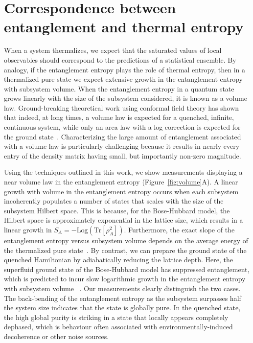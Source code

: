 \section{Correspondence between entanglement and thermal entropy}

When a system thermalizes, we expect that the saturated values of local observables should correspond to the predictions of a statistical ensemble. By analogy, if the entanglement entropy plays the role of thermal entropy, then in a thermalized pure state we expect extensive growth in the entanglement entropy with subsystem volume. When the entanglement entropy in a quantum state grows linearly with the size of the subsystem considered, it is known as a volume law. Ground-breaking theoretical work using conformal field theory has shown that indeed, at long times, a volume law is expected for a quenched, infinite, continuous system, while only an area law with a log correction is expected for the ground state~\cite{CardyGS, CardyOneD, Plenio2010}. Characterizing the large amount of entanglement associated with a volume law is particularly challenging because it results in nearly every entry of the density matrix having small, but importantly non-zero magnitude. 

Using the techniques outlined in this work, we show measurements displaying a near volume law in the entanglement entropy (Figure~\ref{fig:volume}A). A linear growth with volume in the entanglement entropy occurs when each subsystem incoherently populates a number of states that scales with the size of the subsystem Hilbert space. This is because, for the Bose-Hubbard model, the Hilbert space is approximately exponential in the lattice size, which results in a linear growth in $S_A = -\textrm{Log}(\textrm{Tr}[\rho_{A}^2])$. Furthermore, the exact slope of the entanglement entropy versus subsystem volume depends on the average energy of the thermalized pure state~\cite{Grover2015}.  By contrast, we can prepare the ground state of the quenched Hamiltonian by adiabatically reducing the lattice depth. Here, the superfluid ground state of the Bose-Hubbard model has suppressed entanglement, which is predicted to incur slow logarithmic growth in the entanglement entropy with subsystem volume~\cite{CardyGS} . Our measurements clearly distinguish the two cases. The back-bending of the entanglement entropy as the subsystem surpasses half the system size indicates that the state is globally pure. In the quenched state, the high global purity is striking in a state that locally appears completely dephased, which is behaviour often associated with environmentally-induced decoherence or other noise sources. 


